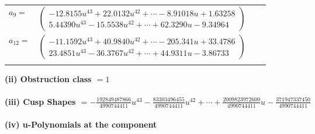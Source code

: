 \documentclass[1p]{elsarticle_modified}
\theoremstyle{definition}
\begin{document}
\begin{tabular}{m{7pt} m{180pt} m{7pt} m{180pt} }
\flushright $a_{9}=$&$\begin{pmatrix}-12.8155 u^{43}+22.0132 u^{42}+\cdots-8.91018 u+1.63258\\5.44390 u^{43}-15.5538 u^{42}+\cdots+62.3290 u-9.34964\end{pmatrix}$ \\
\flushright $a_{12}=$&$\begin{pmatrix}-11.1592 u^{43}+40.9840 u^{42}+\cdots-205.341 u+33.4786\\23.4851 u^{43}-36.3767 u^{42}+\cdots+44.9311 u-3.86733\end{pmatrix}$\\&\end{tabular}
\flushleft \textbf{(ii) Obstruction class $= 1$}\\~\\
\flushleft \textbf{(iii) Cusp Shapes $= -\frac{192849487866}{4990744411} u^{43}-\frac{83303496455}{4990744411} u^{42}+\cdots+\frac{2009823972600}{4990744411} u-\frac{371947337450}{4990744411}$}\\~\\
\newpage\renewcommand{\arraystretch}{1}
\flushleft \textbf{(iv) u-Polynomials at the component}\newline \\
\end{document}
